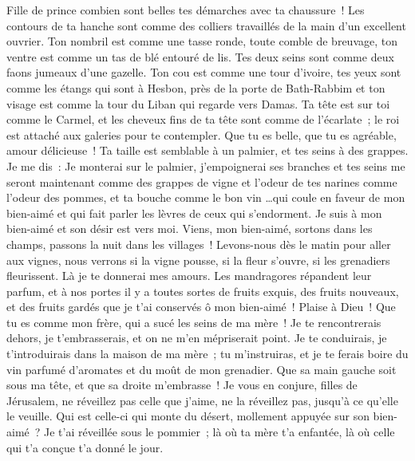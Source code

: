 \begin{multicols}{2}
 Fille de prince combien sont belles tes démarches avec ta chaussure~! Les contours de ta hanche sont comme des colliers travaillés de la main d'un excellent ouvrier.
Ton nombril est comme une tasse ronde, toute comble de breuvage, ton ventre est comme un tas de blé entouré de lis.
Tes deux seins sont comme deux faons jumeaux d'une gazelle.
Ton cou est comme une tour d'ivoire, tes yeux sont comme les étangs qui sont à Hesbon, près de la porte de Bath-Rabbim et ton visage est comme la tour du Liban qui regarde vers Damas.
Ta tête est sur toi comme le Carmel, et les cheveux fins de ta tête sont comme de l'écarlate~; le roi est attaché aux galeries pour te contempler.
 Que tu es belle, que tu es agréable, amour délicieuse~!
Ta taille est semblable à un palmier, et tes seins à des grappes.
Je me dis~: Je monterai sur le palmier, j'empoignerai ses branches et tes seins me seront maintenant comme des grappes de vigne et l'odeur de tes narines comme l'odeur des pommes,
et ta bouche comme le bon vin  …qui coule en faveur de mon bien-aimé et qui fait parler les lèvres de ceux qui s'endorment.
Je suis à mon bien-aimé et son désir est vers moi.
Viens, mon bien-aimé, sortons dans les champs, passons la nuit dans les villages~!
Levons-nous dès le matin pour aller aux vignes, nous verrons si la vigne pousse, si la fleur s'ouvre, si les grenadiers fleurissent. Là je te donnerai mes amours.
Les mandragores répandent leur parfum, et à nos portes il y a toutes sortes de fruits exquis, des fruits nouveaux, et des fruits gardés que je t'ai conservés ô mon bien-aimé~!
\VerseOne{} Plaise à Dieu~! Que tu es comme mon frère, qui a sucé les seins de ma mère~! Je te rencontrerais dehors, je t'embrasserais, et on ne m'en mépriserait point.
Je te conduirais, je t'introduirais dans la maison de ma mère~; tu m'instruiras, et je te ferais boire du vin parfumé d'aromates et du moût de mon grenadier.
Que sa main gauche soit sous ma tête, et que sa droite m'embrasse~!
 Je vous en conjure, filles de Jérusalem, ne réveillez pas celle que j'aime, ne la réveillez pas, jusqu'à ce qu'elle le veuille.
 Qui est celle-ci qui monte du désert, mollement appuyée sur son bien-aimé~?  Je t'ai réveillée sous le pommier~; là où ta mère t'a enfantée, là où celle qui t'a conçue t'a donné le jour.

\end{multicols}
